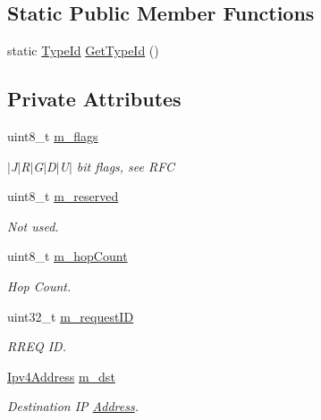 \subsection*{Static Public Member Functions}
\begin{DoxyCompactItemize}
\item 
static \hyperlink{classns3_1_1TypeId}{Type\+Id} \hyperlink{classns3_1_1aodv_1_1RreqHeader_a7e439fdc5e8d94f1d30e69be362e89d4}{Get\+Type\+Id} ()
\end{DoxyCompactItemize}
\subsection*{Private Attributes}
\begin{DoxyCompactItemize}
\item 
uint8\+\_\+t \hyperlink{classns3_1_1aodv_1_1RreqHeader_af0551e8fbcf652fdb6a4e917e45f6e3b}{m\+\_\+flags}
\begin{DoxyCompactList}\small\item\em $\vert$\+J$\vert$\+R$\vert$\+G$\vert$\+D$\vert$\+U$\vert$ bit flags, see R\+FC \end{DoxyCompactList}\item 
uint8\+\_\+t \hyperlink{classns3_1_1aodv_1_1RreqHeader_ac00eed4b5b9ac451c341fe383dd70d68}{m\+\_\+reserved}
\begin{DoxyCompactList}\small\item\em Not used. \end{DoxyCompactList}\item 
uint8\+\_\+t \hyperlink{classns3_1_1aodv_1_1RreqHeader_a413c149d362a3cb3756cb9cbf319e036}{m\+\_\+hop\+Count}
\begin{DoxyCompactList}\small\item\em Hop Count. \end{DoxyCompactList}\item 
uint32\+\_\+t \hyperlink{classns3_1_1aodv_1_1RreqHeader_a85fb153f906e68086a9a7b30ace0cc6e}{m\+\_\+request\+ID}
\begin{DoxyCompactList}\small\item\em R\+R\+EQ ID. \end{DoxyCompactList}\item 
\hyperlink{classns3_1_1Ipv4Address}{Ipv4\+Address} \hyperlink{classns3_1_1aodv_1_1RreqHeader_a746b1707ec1e1e3e679cbe8dde54aa98}{m\+\_\+dst}
\begin{DoxyCompactList}\small\item\em Destination IP \hyperlink{classns3_1_1Address}{Address}. \end{DoxyCompactList}\item 

\end{DoxyCompactItemize}
